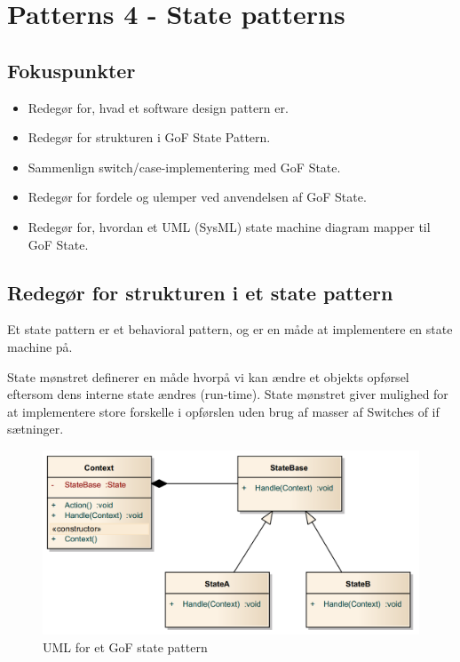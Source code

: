 \section{Patterns 4 - State patterns}

\subsection{Fokuspunkter}

\begin{itemize}
	\item Redegør for, hvad et software design pattern er.
	\item Redegør for strukturen i GoF State Pattern.
	\item Sammenlign  switch/case-implementering med GoF State.
	\item Redegør for fordele og ulemper ved anvendelsen af GoF State.
	\item Redegør for, hvordan et UML (SysML) state machine diagram mapper til GoF State.
\end{itemize}



\subsection{Redegør for strukturen i et state pattern}
Et state pattern er et behavioral pattern, og er en måde at implementere en state machine på.

State mønstret definerer en måde hvorpå vi kan ændre et objekts opførsel eftersom dens interne state ændres (run-time).
State mønstret giver mulighed for at implementere store forskelle i opførslen uden brug af masser af Switches of if sætninger.

\begin{figure}[h]
\centering
\includegraphics[width=0.8\linewidth]{figs/newstate/statepattern_simple}
\caption{UML for et GoF state pattern}
\label{fig:gofState}
\end{figure}

